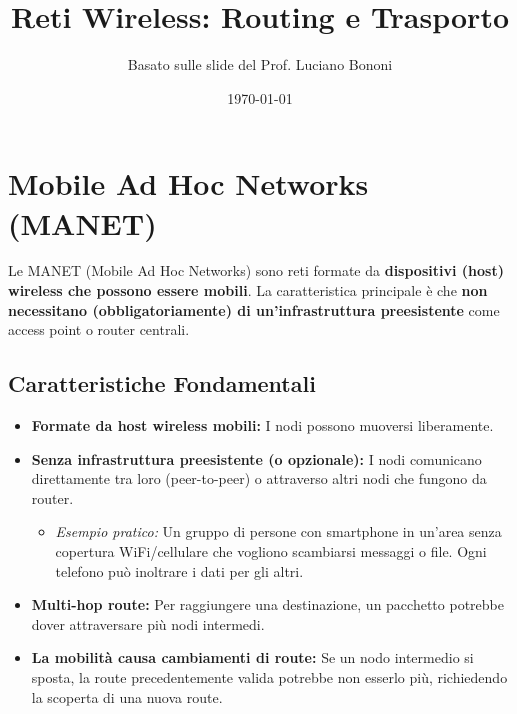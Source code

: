 

\title{Reti Wireless: Routing e Trasporto}
\author{Basato sulle slide del Prof. Luciano Bononi}
\date{\today}



\maketitle
\tableofcontents
\newpage

\section{Mobile Ad Hoc Networks (MANET)}

Le MANET (Mobile Ad Hoc Networks) sono reti formate da \textbf{dispositivi (host) wireless che possono essere mobili}. La caratteristica principale è che \textbf{non necessitano (obbligatoriamente) di un'infrastruttura preesistente} come access point o router centrali.

\subsection{Caratteristiche Fondamentali}
\begin{itemize}
    \item \textbf{Formate da host wireless mobili:} I nodi possono muoversi liberamente.
    \item \textbf{Senza infrastruttura preesistente (o opzionale):} I nodi comunicano direttamente tra loro (peer-to-peer) o attraverso altri nodi che fungono da router.
        \begin{itemize}
            \item \textit{Esempio pratico:} Un gruppo di persone con smartphone in un'area senza copertura WiFi/cellulare che vogliono scambiarsi messaggi o file. Ogni telefono può inoltrare i dati per gli altri.
        \end{itemize}
    \item \textbf{Multi-hop route:} Per raggiungere una destinazione, un pacchetto potrebbe dover attraversare più nodi intermedi.
    \item \textbf{La mobilità causa cambiamenti di route:} Se un nodo intermedio si sposta, la route precedentemente valida potrebbe non esserlo più, richiedendo la scoperta di una nuova route.
\end{itemize}

